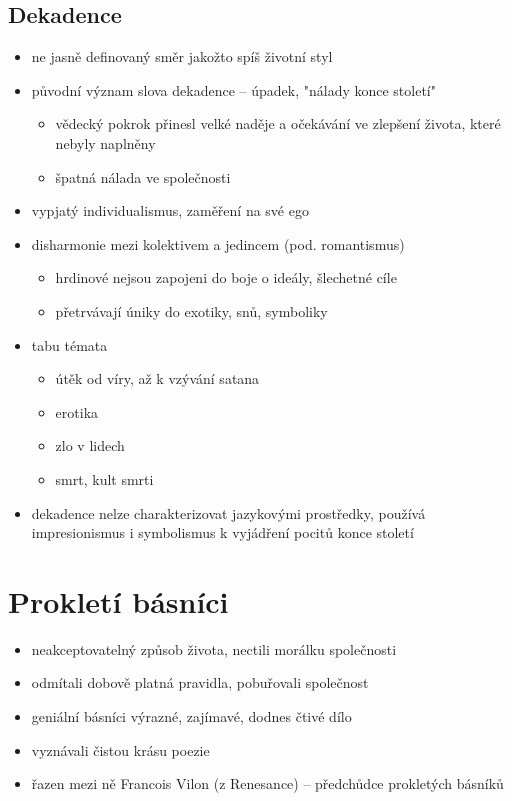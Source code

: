 \subsection{Dekadence}
\begin{itemize}
\item ne jasně definovaný směr jakožto spíš životní styl
\item původní význam slova dekadence -- úpadek, "nálady konce století" 
	\begin{itemize}
	\item vědecký pokrok přinesl velké naděje a očekávání ve zlepšení života, které nebyly naplněny
	\item[\ra] špatná nálada ve společnosti
	\end{itemize}
\item vypjatý individualismus, zaměření na své ego
\item disharmonie mezi kolektivem a jedincem (pod. romantismus)
	\begin{itemize}
	\item hrdinové nejsou zapojeni do boje o ideály, šlechetné cíle
	\item přetrvávají úniky do exotiky, snů, symboliky
	\end{itemize}
\item tabu témata
	\begin{itemize}
	\item útěk od víry, až k vzývání satana
	\item erotika
	\item zlo v lidech
	\item smrt, kult smrti
	\end{itemize}
\item dekadence nelze charakterizovat jazykovými prostředky, používá impresionismus i symbolismus k vyjádření pocitů konce století
\end{itemize}

\section{Prokletí básníci}
\begin{itemize}
\item neakceptovatelný způsob života, nectili morálku společnosti
\item odmítali dobově platná pravidla, pobuřovali společnost
\item geniální básníci \ra výrazné, zajímavé, dodnes čtivé dílo
\item vyznávali čistou krásu poezie
\item řazen mezi ně Francois Vilon (z Renesance) -- předchůdce prokletých básníků
\end{itemize}



